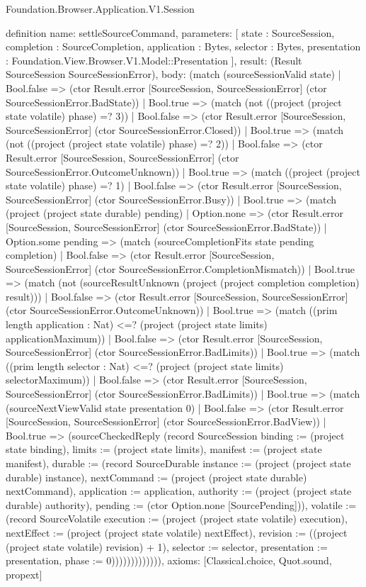 \begin{lexlean}{Foundation.Browser.Application.V1.Session}
\begin{semanticmodule}
definition{
  name: settleSourceCommand,
  parameters: [
    state : SourceSession,
    completion : SourceCompletion,
    application : Bytes,
    selector : Bytes,
    presentation : Foundation.View.Browser.V1.Model::Presentation
  ],
  result: (Result SourceSession SourceSessionError),
  body: (match (sourceSessionValid state)
    | Bool.false => (ctor Result.error [SourceSession, SourceSessionError] (ctor SourceSessionError.BadState))
    | Bool.true => (match (not ((project (project state volatile) phase) =? 3))
      | Bool.false => (ctor Result.error [SourceSession, SourceSessionError] (ctor SourceSessionError.Closed))
      | Bool.true => (match (not ((project (project state volatile) phase) =? 2))
        | Bool.false => (ctor Result.error [SourceSession, SourceSessionError] (ctor SourceSessionError.OutcomeUnknown))
        | Bool.true => (match ((project (project state volatile) phase) =? 1)
          | Bool.false => (ctor Result.error [SourceSession, SourceSessionError] (ctor SourceSessionError.Busy))
          | Bool.true => (match (project (project state durable) pending)
            | Option.none => (ctor Result.error [SourceSession, SourceSessionError] (ctor SourceSessionError.BadState))
            | Option.some pending => (match (sourceCompletionFits state pending completion)
              | Bool.false => (ctor Result.error [SourceSession, SourceSessionError] (ctor SourceSessionError.CompletionMismatch))
              | Bool.true => (match (not (sourceResultUnknown (project (project completion completion) result)))
                | Bool.false => (ctor Result.error [SourceSession, SourceSessionError] (ctor SourceSessionError.OutcomeUnknown))
                | Bool.true => (match ((prim length application : Nat) <=? (project (project state limits) applicationMaximum))
                  | Bool.false => (ctor Result.error [SourceSession, SourceSessionError] (ctor SourceSessionError.BadLimits))
                  | Bool.true => (match ((prim length selector : Nat) <=? (project (project state limits) selectorMaximum))
                    | Bool.false => (ctor Result.error [SourceSession, SourceSessionError] (ctor SourceSessionError.BadLimits))
                    | Bool.true => (match (sourceNextViewValid state presentation 0)
                      | Bool.false => (ctor Result.error [SourceSession, SourceSessionError] (ctor SourceSessionError.BadView))
                      | Bool.true => (sourceCheckedReply (record SourceSession {binding := (project state binding), limits := (project state limits), manifest := (project state manifest), durable := (record SourceDurable {instance := (project (project state durable) instance), nextCommand := (project (project state durable) nextCommand), application := application, authority := (project (project state durable) authority), pending := (ctor Option.none [SourcePending])}), volatile := (record SourceVolatile {execution := (project (project state volatile) execution), nextEffect := (project (project state volatile) nextEffect), revision := ((project (project state volatile) revision) + 1), selector := selector, presentation := presentation, phase := 0})})))))))))))),
  axioms: [Classical.choice, Quot.sound, propext]
}


\end{semanticmodule}
\end{lexlean}
